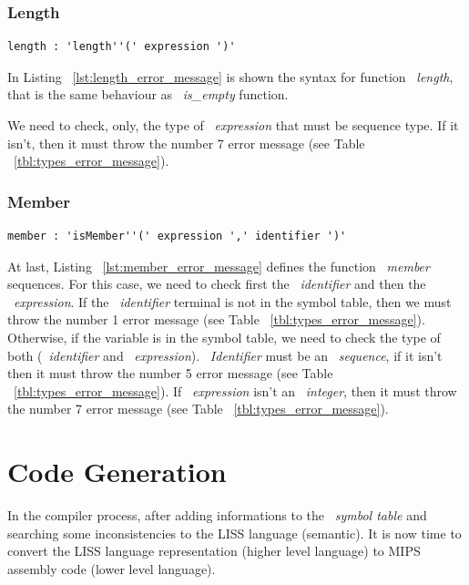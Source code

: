 \documentclass[
  oneside,
  11pt, a4paper,
  footinclude=true,
  headinclude=true,
  cleardoublepage=empty
]{scrbook}
\begin{document}
\subsubsection{Length}

\begin{lstlisting}[caption={Length rule in LISS},label={lst:length_error_message}]
  length : 'length''(' expression ')'
\end{lstlisting}

In Listing ~\ref{lst:length_error_message} is shown the syntax for function ~\textit{length}, that is the same behaviour as ~\textit{is\_empty} function.

We need to check, only, the type of ~\textit{expression} that must be sequence type.
If it isn't, then it must throw the number 7 error message (see Table ~\ref{tbl:types_error_message}).

\subsubsection{Member}

\begin{lstlisting}[caption={Member rule in LISS},label={lst:member_error_message}]
  member : 'isMember''(' expression ',' identifier ')'
\end{lstlisting}

At last, Listing ~\ref{lst:member_error_message} defines the function ~\textit{member} sequences.
For this case, we need to check first the ~\textit{identifier} and then the ~\textit{expression}.
If the ~\textit{identifier} terminal is not in the symbol table, then we must throw the number 1 error message (see Table ~\ref{tbl:types_error_message}).
Otherwise, if the variable is in the symbol table, we need to check the type of both (~\textit{identifier} and ~\textit{expression}).
~\textit{Identifier} must be an ~\textit{sequence}, if it isn't then it must throw the number 5 error message (see Table ~\ref{tbl:types_error_message}).
If ~\textit{expression} isn't an ~\textit{integer}, then it must throw the number 7 error message (see Table ~\ref{tbl:types_error_message}).



\section{Code Generation}
\label{sct:code_generation}

In the compiler process, after adding informations to the ~\textit{symbol table} and searching some inconsistencies to the LISS language (semantic). It is now time to convert the LISS language representation (higher level language) to MIPS assembly code (lower level language).
\end{document}
